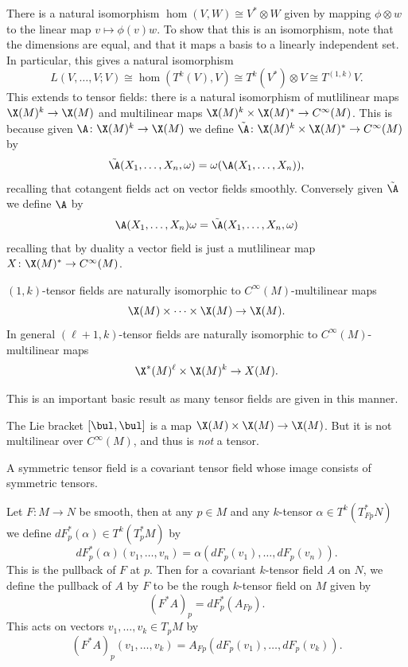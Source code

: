 There is a natural isomorphism $\hom(V,W)\cong V^*\otimes W$ given by mapping $\phi\otimes w$ to the linear map
$v\mapsto\phi(v)w$.
To show that this is an isomorphism, note that the dimensions are equal, and that it maps a basis to a linearly independent
set.
In particular, this gives a natural isomorphism
$$ L(V,\dots,V;V) \cong \hom(T^k(V),V) \cong T^k(V^*)\otimes V \cong T^{(1,k)}V . $$
This extends to tensor fields: there is a natural isomorphism of mutlilinear maps $\X(M)^k\to\X(M)$ and multilinear maps
$\X(M)^k\times\X(M)^*\to C^\infty(M)$.
This is because given $\A\colon\X(M)^k\to\X(M)$ we define $\tilde\A\colon\X(M)^k\times\X(M)^*\to C^\infty(M)$ by
$$ \tilde\A(X_1,\dots,X_n,\omega) = \omega(\A(X_1,\dots,X_n)) , $$
recalling that cotangent fields act on vector fields smoothly.
Conversely given $\tilde\A$ we define $\A$ by
$$ \A(X_1,\dots,X_n)\omega = \tilde\A(X_1,\dots,X_n,\omega) $$
recalling that by duality a vector field is just a mutlilinear map $X\colon\X(M)^*\to C^\infty(M)$.

\bprop

    $(1,k)$-tensor fields are naturally isomorphic to $C^\infty(M)$-multilinear maps
    $$ \X(M)\times\cdots\times\X(M)\to\X(M) . $$
    In general $(\ell+1,k)$-tensor fields are naturally isomorphic to $C^\infty(M)$-multilinear maps
    $$ \X^*(M)^\ell\times\X(M)^k \to X(M) . $$

\eprop

This is an important basic result as many tensor fields are given in this manner.

\bexam

    The Lie bracket $[\bul,\bul]$ is a map $\X(M)\times\X(M)\to\X(M)$.
    But it is not multilinear over $C^\infty(M)$, and thus is {\it not\/} a tensor.

\eexam

\bdefn

    A {\emphcolor symmetric tensor field} is a covariant tensor field whose image consists of symmetric tensors.

\edefn

\bdefn

    Let $F\colon M\to N$ be smooth, then at any $p\in M$ and any $k$-tensor $\alpha\in T^k(T^*_{Fp}N)$ we define $dF^*_p(\alpha)\in T^k(T^*_pM)$ by
    $$ dF^*_p(\alpha)(v_1,\dots,v_n) = \alpha(dF_p(v_1),\dots,dF_p(v_n)) . $$
    This is the {\emphcolor pullback of $F$ at $p$}.
    Then for a covariant $k$-tensor field $A$ on $N$, we define the {\emphcolor pullback of $A$ by $F$} to be the rough $k$-tensor field on $M$ given by
    $$ (F^*A)_p = dF^*_p(A_{Fp}) . $$
    This acts on vectors $v_1,\dots,v_k\in T_pM$ by
    $$ (F^*A)_p(v_1,\dots,v_k) = A_{Fp}(dF_p(v_1),\dots,dF_p(v_k)) . $$

